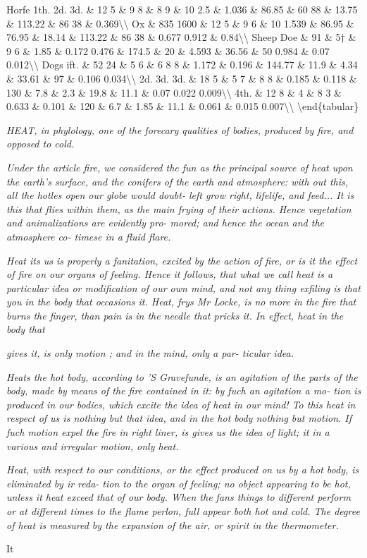 Horfe 1th. 2d. 3d. \& 12 5 \& 9 8 \& 8 9 \& 10 2.5 \& 1.036 \& 86.85 \& 60 88 \& 13.75 \& 113.22 \& 86 38 \& 0.369\textbackslash{}\textbackslash{}
Ox \& 835 1600 \& 12 5 \& 9 6 \& 10 1.539 \& 86.95 \& 76.95 \& 18.14 \& 113.22 \& 86 38 \& 0.677 0.912 \& 0.84\textbackslash{}\textbackslash{}
Sheep Doe \& 91 \& 5† \& 9 6 \& 1.85 \& 0.172 0.476 \& 174.5 \& 20 \& 4.593 \& 36.56 \& 50 0.984 \& 0.07 0.012\textbackslash{}\textbackslash{}
Dogs ift. \& 52 24 \& 5 6 \& 6 8 8 \& 1.172 \& 0.196 \& 144.77 \& 11.9 \& 4.34 \& 33.61 \& 97 \& 0.106 0.034\textbackslash{}\textbackslash{}
2d. 3d. 3d. \& 18 5 \& 5 7 \& 8 8 \& 0.185 \& 0.118 \& 130 \& 7.8 \& 2.3 \& 19.8 \& 11.1 \& 0.07 0.022 0.009\textbackslash{}\textbackslash{}
4th. \& 12 8 \& 4 \& 8 3 \& 0.633 \& 0.101 \& 120 \& 6.7 \& 1.85 \& 11.1 \& 0.061 \& 0.015 0.007\textbackslash{}\textbackslash{}
\textbackslash{}end\{tabular\}\par\medskip
{\small\itshape HEAT, in phylology, one of the forecary qualities of bodies, produced by fire, and opposed to cold.\par}\medskip
{\small\itshape Under the article fire, we considered the fun as the principal source of heat upon the earth's surface, and the conifers of the earth and atmosphere: with out this, all the hotles open our globe would doubt- left grow right, lifelife, and feed... It is this that flies within them, as the main frying of their actions. Hence vegetation and animalizations are evidently pro- mored; and hence the ocean and the atmosphere co- timese in a fluid flare.\par}\medskip
{\small\itshape Heat its us is properly a fanitation, excited by the action of fire, or is it the effect of fire on our organs of feeling. Hence it follows, that what we call heat is a particular idea or modification of our own mind, and not any thing exfiling is that you in the body that occasions it. Heat, frys Mr Locke, is no more in the fire that burns the finger, than pain is in the needle that pricks it. In effect, heat in the body that\par}\medskip
{\small\itshape gives it, is only motion ; and in the mind, only a par- ticular idea.\par}\medskip
{\small\itshape Heats the hot body, according to 'S Gravefunde, is an agitation of the parts of the body, made by means of the fire contained in it: by fuch an agitation a mo- tion is produced in our bodies, which excite the idea of heat in our mind! To this heat in respect of us is nothing but that idea, and in the hot body nothing but motion. If fuch motion expel the fire in right liner, is gives us the idea of light; it in a various and irregular motion, only heat.\par}\medskip
{\small\itshape Heat, with respect to our conditions, or the effect produced on us by a hot body, is eliminated by ir reda- tion to the organ of feeling; no object appearing to be hot, unless it heat exceed that of our body. When the fans things to different perform or at different times to the flame perlon, full appear both hot and cold. The degree of heat is measured by the expansion of the air, or spirit in the thermometer.\par}\medskip
It\par\medskip
